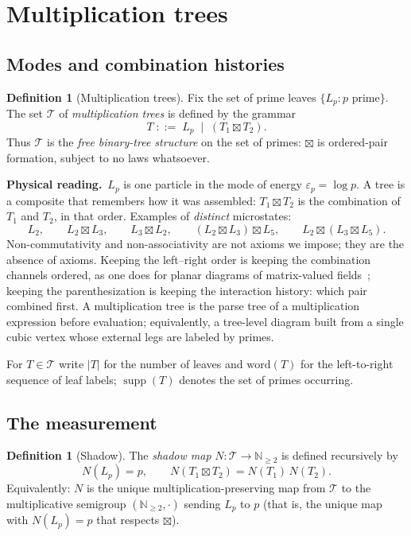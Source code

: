 \documentclass[11pt]{article}
\newcommand{\cT}{\mathcal{T}}   %
\newcommand{\NN}{\mathbb{N}}
\newcommand{\physread}{\medskip\noindent\textbf{Physical reading.}\ }
\DeclareMathOperator{\supp}{supp}
\numberwithin{equation}{section}
\theoremstyle{plain}
\theoremstyle{definition}
\newtheorem{definition}[theorem]{Definition}
\theoremstyle{remark}
\begin{document}
\section{Multiplication trees}\label{sec:trees}

\subsection{Modes and combination histories}

\begin{definition}[Multiplication trees]\label{def:trees}
Fix the set of prime leaves $\{L_p : p \text{ prime}\}$. The set $\cT$ of
\emph{multiplication trees} is defined by the grammar
\[
T \;::=\; L_p \;\mid\; (T_1 \boxtimes T_2).
\]
Thus $\cT$ is the \emph{free binary-tree structure} on the set of primes: $\boxtimes$
is ordered-pair formation, subject to no laws whatsoever.
\end{definition}

\physread $L_p$ is one particle in the mode of energy $\varepsilon_p = \log p$. A
tree is a composite that remembers how it was assembled: $T_1 \boxtimes T_2$ is the
combination of $T_1$ and $T_2$, in that order. Examples of \emph{distinct}
microstates:
\[
L_2, \qquad
L_2 \boxtimes L_3, \qquad
L_3 \boxtimes L_2, \qquad
(L_2 \boxtimes L_3) \boxtimes L_5, \qquad
L_2 \boxtimes (L_3 \boxtimes L_5).
\]
Non-commutativity and non-associativity are not axioms we impose; they are the
absence of axioms. Keeping the left--right order is keeping the combination
channels ordered, as one does for planar diagrams of matrix-valued
fields~\cite{thooft}; keeping the parenthesization is keeping the interaction history:
which pair combined first. A multiplication tree is the parse tree of a
multiplication expression before evaluation; equivalently, a tree-level diagram built
from a single cubic vertex whose external legs are labeled by primes.

For $T \in \cT$ write $|T|$ for the number of leaves and $\mathrm{word}(T)$ for the
left-to-right sequence of leaf labels; $\supp(T)$ denotes the set of primes occurring.

\subsection{The measurement}

\begin{definition}[Shadow]\label{def:shadow}
The \emph{shadow map} $N \colon \cT \to \NN_{\ge 2}$ is defined recursively by
\[
N(L_p) = p, \qquad N(T_1 \boxtimes T_2) = N(T_1)\,N(T_2).
\]
Equivalently: $N$ is the unique multiplication-preserving map from $\cT$ to the
multiplicative semigroup $(\NN_{\ge2},\cdot)$ sending $L_p$ to $p$ (that is, the
unique map with $N(L_p)=p$ that respects $\boxtimes$).
\end{definition}
\end{document}
